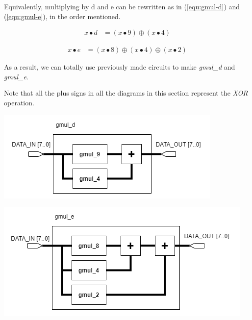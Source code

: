 \documentclass[a4paper, 10pt]{article}
\newenvironment{Figure}
    {\par\medskip\noindent\minipage{\linewidth}}
    {\endminipage\par\medskip}
\begin{document}
\begin{multicols}{2}
	Equivalently, multiplying by d and e can be rewritten as in (\ref{equ:gmul-d}) and (\ref{equ:gmul-e}), in the order mentioned.

\begin{equation}
\label{equ:gmul-d}
\begin{aligned}
	x \bullet d & = (x \bullet 9) \oplus (x \bullet 4)
\end{aligned}
\end{equation}

\begin{equation}
\label{equ:gmul-e}
\begin{aligned}
	x \bullet e & = (x \bullet 8) \oplus (x \bullet 4) \oplus (x \bullet 2)
\end{aligned}
\end{equation}

	As a result, we can totally use previously made circuits to make \textit{gmul\_d} and \textit{gmul\_e}.

	Note that all the plus signs in all the diagrams in this section represent the \textit{XOR} operation.

	\noindent
            \begin{Figure}
                \centering
                \includegraphics[width=\linewidth]{InvMixColumns-gmul_d.png}
                \label{fig:gmul-d}
            \end{Figure}

	\noindent
            \begin{Figure}
                \centering
                \includegraphics[width=\linewidth]{InvMixColumns-gmul_e.png}
                \label{fig:gmul-e}
            \end{Figure}


\end{multicols}
\end{document}
